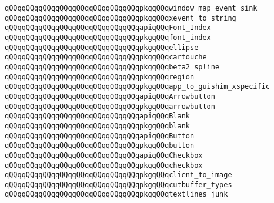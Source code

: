 \verb|qQQqqQQqqQQqqQQqqQQqqQQqqQQqqQQqpkgqQQqwindow_map_event_sink|\newline
\verb|qQQqqQQqqQQqqQQqqQQqqQQqqQQqqQQqpkgqQQqxevent_to_string|\newline
\newline
\verb|qQQqqQQqqQQqqQQqqQQqqQQqqQQqqQQqapiqQQqFont_Index|\newline
\verb|qQQqqQQqqQQqqQQqqQQqqQQqqQQqqQQqpkgqQQqfont_index|\newline
\newline
\newline
\verb|qQQqqQQqqQQqqQQqqQQqqQQqqQQqqQQqpkgqQQqellipse|\newline
\verb|qQQqqQQqqQQqqQQqqQQqqQQqqQQqqQQqpkgqQQqcartouche|\newline
\verb|qQQqqQQqqQQqqQQqqQQqqQQqqQQqqQQqpkgqQQqbeta2_spline|\newline
\verb|qQQqqQQqqQQqqQQqqQQqqQQqqQQqqQQqpkgqQQqregion|\newline
\newline
\newline
\verb|qQQqqQQqqQQqqQQqqQQqqQQqqQQqqQQqpkgqQQqapp_to_guishim_xspecific|\newline
\newline
\verb|qQQqqQQqqQQqqQQqqQQqqQQqqQQqqQQqapiqQQqArrowbutton|\newline
\verb|qQQqqQQqqQQqqQQqqQQqqQQqqQQqqQQqpkgqQQqarrowbutton|\newline
\newline
\verb|qQQqqQQqqQQqqQQqqQQqqQQqqQQqqQQqapiqQQqBlank|\newline
\verb|qQQqqQQqqQQqqQQqqQQqqQQqqQQqqQQqpkgqQQqblank|\newline
\newline
\verb|qQQqqQQqqQQqqQQqqQQqqQQqqQQqqQQqapiqQQqButton|\newline
\verb|qQQqqQQqqQQqqQQqqQQqqQQqqQQqqQQqpkgqQQqbutton|\newline
\newline
\verb|qQQqqQQqqQQqqQQqqQQqqQQqqQQqqQQqapiqQQqCheckbox|\newline
\verb|qQQqqQQqqQQqqQQqqQQqqQQqqQQqqQQqpkgqQQqcheckbox|\newline
\newline
\verb|qQQqqQQqqQQqqQQqqQQqqQQqqQQqqQQqpkgqQQqclient_to_image|\newline
\verb|qQQqqQQqqQQqqQQqqQQqqQQqqQQqqQQqpkgqQQqcutbuffer_types|\newline
\verb|qQQqqQQqqQQqqQQqqQQqqQQqqQQqqQQqpkgqQQqtextlines_junk|\newline
